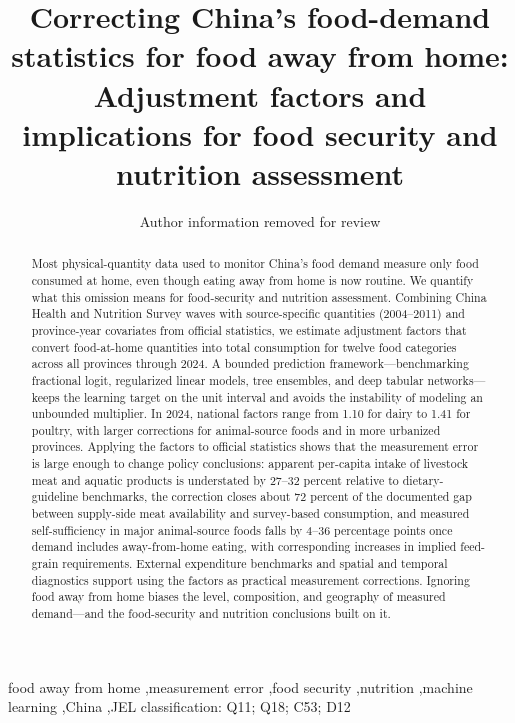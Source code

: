 \documentclass[preprint,12pt,authoryear]{elsarticle}
\begin{document}
\begin{frontmatter}

\title{Correcting China's food-demand statistics for food away from home: Adjustment factors and implications for food security and nutrition assessment}

\author[aff1]{Author information removed for review}
\address[aff1]{Affiliations removed for review}

\begin{abstract}
Most physical-quantity data used to monitor China's food demand measure only food consumed at home, even though eating away from home is now routine. We quantify what this omission means for food-security and nutrition assessment. Combining China Health and Nutrition Survey waves with source-specific quantities (2004--2011) and province-year covariates from official statistics, we estimate adjustment factors that convert food-at-home quantities into total consumption for twelve food categories across all provinces through 2024. A bounded prediction framework---benchmarking fractional logit, regularized linear models, tree ensembles, and deep tabular networks---keeps the learning target on the unit interval and avoids the instability of modeling an unbounded multiplier. In 2024, national factors range from 1.10 for dairy to 1.41 for poultry, with larger corrections for animal-source foods and in more urbanized provinces. Applying the factors to official statistics shows that the measurement error is large enough to change policy conclusions: apparent per-capita intake of livestock meat and aquatic products is understated by 27--32 percent relative to dietary-guideline benchmarks, the correction closes about 72 percent of the documented gap between supply-side meat availability and survey-based consumption, and measured self-sufficiency in major animal-source foods falls by 4--36 percentage points once demand includes away-from-home eating, with corresponding increases in implied feed-grain requirements. External expenditure benchmarks and spatial and temporal diagnostics support using the factors as practical measurement corrections. Ignoring food away from home biases the level, composition, and geography of measured demand---and the food-security and nutrition conclusions built on it.
\end{abstract}

\begin{keyword}
food away from home \sep measurement error \sep food security \sep nutrition \sep machine learning \sep China \sep JEL classification: Q11; Q18; C53; D12
\end{keyword}

\end{frontmatter}
\end{document}
